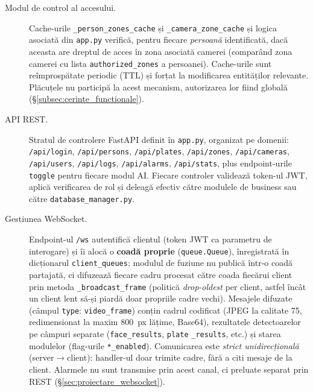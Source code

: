 \documentclass[../../main.tex]{subfiles}
\begin{document}
\begin{description}
    \item[Modul de control al accesului.] Cache-urile \texttt{\_person\_zones\_cache} și \linebreak \texttt{\_camera\_zone\_cache} și logica asociată din \texttt{app.py} verifică, pentru fiecare \emph{persoană} identificată, dacă aceasta are dreptul de acces în zona asociată camerei (comparând zona camerei cu lista \texttt{authorized\_zones} a persoanei). Cache-urile sunt reîmprospătate periodic (TTL) și forțat la modificarea entităților relevante. Plăcuțele nu participă la acest mecanism, autorizarea lor fiind globală (\S\ref{subsec:cerinte_functionale}).

    \item[API REST.] Stratul de controlere FastAPI definit în \texttt{app.py}, organizat pe domenii: \texttt{/api/login}, \texttt{/api/persons}, \texttt{/api/plates}, \texttt{/api/zones}, \linebreak\texttt{/api/cameras}, \texttt{/api/users}, \texttt{/api/logs}, \texttt{/api/alarms}, \texttt{/api/stats}, plus endpoint-urile \texttt{toggle} pentru fiecare modul AI. Fiecare controler validează token-ul JWT, aplică verificarea de rol și deleagă efectiv către modulele de business sau către \texttt{database\_manager.py}.

    \item[Gestiunea WebSocket.] Endpoint-ul \texttt{/ws} autentifică clientul (token JWT ca parametru de interogare) și îi alocă o \textbf{coadă proprie} (\texttt{queue.Queue}), înregistrată în dicționarul \texttt{client\_queues}; modulul de fuziune nu publică într-o coadă partajată, ci difuzează fiecare cadru procesat către coada fiecărui client prin metoda \texttt{\_broadcast\_frame} (politică \emph{drop-oldest} per client, astfel încât un client lent să-și piardă doar propriile cadre vechi). Mesajele difuzate (câmpul \texttt{type}: \texttt{video\_frame}) conțin cadrul codificat (JPEG la calitate 75, redimensionat la maxim 800~px lățime, Base64), rezultatele detectoarelor pe câmpuri separate (\texttt{face\_results}, \texttt{plate} \linebreak \texttt{\_results}, etc.) și starea modulelor (flag-urile \texttt{*\_enabled}). Comunicarea este \emph{strict unidirecțională} (server$\to$client): handler-ul doar trimite cadre, fără a citi mesaje de la client. Alarmele nu sunt transmise prin acest canal, ci preluate separat prin REST (\S\ref{sec:proiectare_websocket}).


\end{description}
\end{document}

